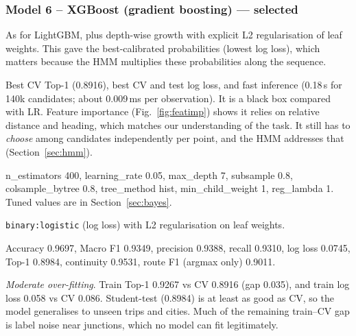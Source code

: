 \documentclass[10pt,a4paper]{article}
\newcommand{\code}[1]{\texttt{\small #1}}
\newenvironment{qa}{\begin{description}[leftmargin=0pt,labelsep=0.4em,itemsep=2pt,font=\bfseries\color{accent!80!black}]}{\end{description}}
\begin{document}
\subsubsection*{Model 6 -- XGBoost (gradient boosting) --- selected}
\begin{qa}
\item[A1. Why suitable?] As for LightGBM, plus depth-wise growth with explicit L2 regularisation of leaf weights. This gave the best-calibrated probabilities (lowest log loss), which matters because the HMM multiplies these probabilities along the sequence.
\item[A2. Strengths / limitations.] Best CV Top-1 (0.8916), best CV and test log loss, and fast inference (0.18\,s for 140k candidates; about 0.009\,ms per observation). It is a black box compared with LR. Feature importance (Fig.~\ref{fig:featimp}) shows it relies on relative distance and heading, which matches our understanding of the task. It still has to \emph{choose} among candidates independently per point, and the HMM addresses that (Section~\ref{sec:hmm}).
\item[B5. Hyperparameters (initial).] n\_estimators 400, learning\_rate 0.05, max\_depth 7, subsample 0.8, colsample\_bytree 0.8, tree\_method hist, min\_child\_weight 1, reg\_lambda 1. Tuned values are in Section~\ref{sec:bayes}.
\item[B6. Objective.] \code{binary:logistic} (log loss) with L2 regularisation on leaf weights.
\item[C7/C8. Student-test.] Accuracy 0.9697, Macro F1 0.9349, precision 0.9388, recall 0.9310, log loss 0.0745, Top-1 0.8984, continuity 0.9531, route F1 (argmax only) 0.9011.
\item[C9. Fit.] \emph{Moderate over-fitting}. Train Top-1 0.9267 vs CV 0.8916 (gap 0.035), and train log loss 0.058 vs CV 0.086. Student-test (0.8984) is at least as good as CV, so the model generalises to unseen trips and cities. Much of the remaining train--CV gap is label noise near junctions, which no model can fit legitimately.
\end{qa}
\end{document}
